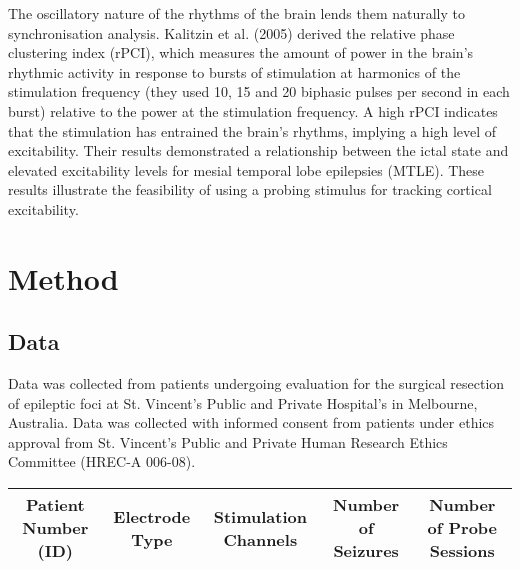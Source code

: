 \documentclass[]{article}
\begin{document}
The oscillatory nature of the rhythms of the brain lends them naturally to synchronisation analysis. 
Kalitzin et al. (2005) derived the relative phase clustering index (rPCI), which measures the amount of power in the brain’s rhythmic activity in response to bursts of stimulation at harmonics of the stimulation frequency (they used 10, 15 and 20 biphasic pulses per second in each burst) relative to the power at the stimulation frequency. A high rPCI indicates that the stimulation has entrained the brain’s rhythms, implying a high level of excitability. Their results demonstrated a relationship between the ictal state and elevated excitability levels for mesial temporal lobe epilepsies (MTLE). These results illustrate the feasibility of using a probing stimulus for tracking cortical excitability.

\section{Method}

\subsection{Data}
Data was collected from patients undergoing  evaluation for the surgical resection of epileptic foci at St. Vincent's Public and Private Hospital's in Melbourne, Australia. Data was collected with informed consent from patients under ethics approval from St. Vincent's Public and Private Human Research Ethics Committee (HREC-A 006-08).

\begin{tabular}{c|c|c|c|c} \hline
\textbf{Patient Number (ID)} & \textbf{Electrode Type} & \textbf{Stimulation Channels} & \textbf{Number of Seizures} & Number of Probe Sessions\\ \hline
\end{tabular}

 


\end{document}
